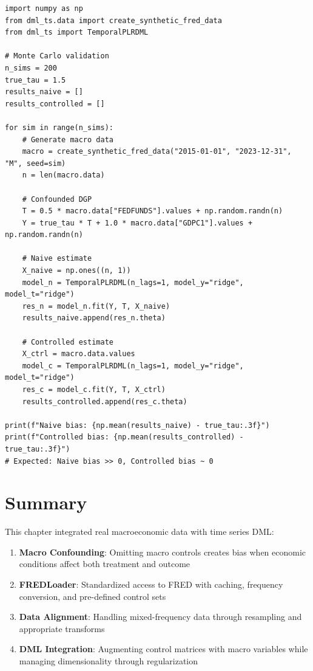 \begin{verbatim}
import numpy as np
from dml_ts.data import create_synthetic_fred_data
from dml_ts import TemporalPLRDML

# Monte Carlo validation
n_sims = 200
true_tau = 1.5
results_naive = []
results_controlled = []

for sim in range(n_sims):
    # Generate macro data
    macro = create_synthetic_fred_data("2015-01-01", "2023-12-31", "M", seed=sim)
    n = len(macro.data)

    # Confounded DGP
    T = 0.5 * macro.data["FEDFUNDS"].values + np.random.randn(n)
    Y = true_tau * T + 1.0 * macro.data["GDPC1"].values + np.random.randn(n)

    # Naive estimate
    X_naive = np.ones((n, 1))
    model_n = TemporalPLRDML(n_lags=1, model_y="ridge", model_t="ridge")
    res_n = model_n.fit(Y, T, X_naive)
    results_naive.append(res_n.theta)

    # Controlled estimate
    X_ctrl = macro.data.values
    model_c = TemporalPLRDML(n_lags=1, model_y="ridge", model_t="ridge")
    res_c = model_c.fit(Y, T, X_ctrl)
    results_controlled.append(res_c.theta)

print(f"Naive bias: {np.mean(results_naive) - true_tau:.3f}")
print(f"Controlled bias: {np.mean(results_controlled) - true_tau:.3f}")
# Expected: Naive bias >> 0, Controlled bias ~ 0
\end{verbatim}

\section{Summary}\label{sec:summary_ch07}

This chapter integrated real macroeconomic data with time series DML:

\begin{enumerate}
    \item \textbf{Macro Confounding}: Omitting macro controls creates bias when economic conditions affect both treatment and outcome

    \item \textbf{FREDLoader}: Standardized access to FRED with caching, frequency conversion, and pre-defined control sets

    \item \textbf{Data Alignment}: Handling mixed-frequency data through resampling and appropriate transforms

    \item \textbf{DML Integration}: Augmenting control matrices with macro variables while managing dimensionality through regularization
\end{enumerate}

